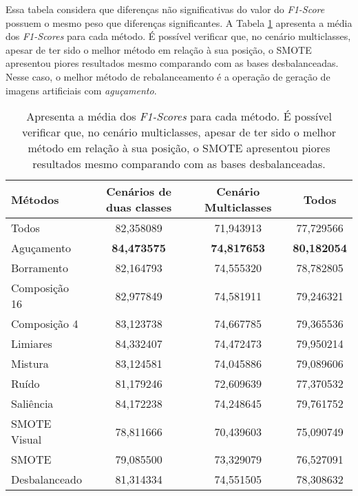 Essa tabela considera que diferenças não significativas do valor do \textit{F1-Score} possuem o mesmo peso que diferenças significantes. A Tabela \ref{tab:allfscore} apresenta a média dos \textit{F1-Scores} para cada método. É possível verificar que, no cenário multiclasses, apesar de ter sido o melhor método em relação à sua posição, o SMOTE apresentou piores resultados mesmo comparando com as bases desbalanceadas. Nesse caso, o melhor método de rebalanceamento é a operação de geração de imagens artificiais com \textit{aguçamento}.

\begin{table}[!htbp]
\centering
\caption{Apresenta a média dos \textit{F1-Scores} para cada método. É possível verificar que, no cenário multiclasses, apesar de ter sido o melhor método em relação à sua posição, o SMOTE apresentou piores resultados mesmo comparando com as bases desbalanceadas.}
\label{tab:allfscore}
\begin{tabular}{|l|c|c|c|}
\hline
\textbf{Métodos} & \textbf{Cenários de duas classes} & \textbf{Cenário Multiclasses} & \textbf{Todos}         \\ \hline
Todos            & 82,358089                    & 71,943913                & 77,729566         \\ \hline
Aguçamento       & \textbf{84,473575}           & \textbf{74,817653}       & \textbf{80,182054} \\ \hline
Borramento       & 82,164793                    & 74,555320                & 78,782805         \\ \hline
Composição 16    & 82,977849                    & 74,581911                & 79,246321         \\ \hline
Composição 4     & 83,123738                    & 74,667785                & 79,365536         \\ \hline
Limiares         & 84,332407                    & 74,472473                & 79,950214         \\ \hline
Mistura          & 83,124581                    & 74,045886                & 79,089606         \\ \hline
Ruído            & 81,179246                    & 72,609639                & 77,370532         \\ \hline
Saliência        & 84,172238                    & 74,248645                & 79,761752         \\ \hline
SMOTE Visual     & 78,811666                    & 70,439603                & 75,090749         \\ \hline
SMOTE            & 79,085500                    & 73,329079                & 76,527091         \\ \hline
Desbalanceado    & 81,314334                    & 74,551505                & 78,308632         \\ \hline
\end{tabular}
\end{table}

